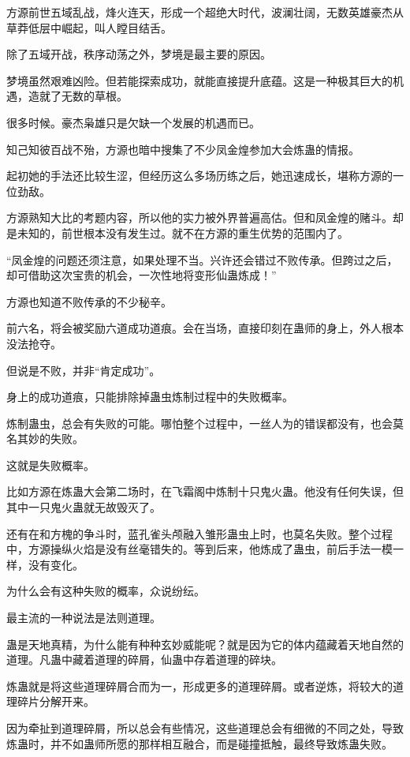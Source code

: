 \begin{this_body}
方源前世五域乱战，烽火连天，形成一个超绝大时代，波澜壮阔，无数英雄豪杰从草莽低层中崛起，叫人瞠目结舌。

除了五域开战，秩序动荡之外，梦境是最主要的原因。

梦境虽然艰难凶险。但若能探索成功，就能直接提升底蕴。这是一种极其巨大的机遇，造就了无数的草根。

很多时候。豪杰枭雄只是欠缺一个发展的机遇而已。

知己知彼百战不殆，方源也暗中搜集了不少凤金煌参加大会炼蛊的情报。

起初她的手法还比较生涩，但经历这么多场历练之后，她迅速成长，堪称方源的一位劲敌。

方源熟知大比的考题内容，所以他的实力被外界普遍高估。但和凤金煌的赌斗。却是未知的，前世根本没有发生过。就不在方源的重生优势的范围内了。

“凤金煌的问题还须注意，如果处理不当。兴许还会错过不败传承。但跨过之后，却可借助这次宝贵的机会，一次性地将变形仙蛊炼成！”

方源也知道不败传承的不少秘辛。

前六名，将会被奖励六道成功道痕。会在当场，直接印刻在蛊师的身上，外人根本没法抢夺。

但说是不败，并非“肯定成功”。

身上的成功道痕，只能排除掉蛊虫炼制过程中的失败概率。

炼制蛊虫，总会有失败的可能。哪怕整个过程中，一丝人为的错误都没有，也会莫名其妙的失败。

这就是失败概率。

比如方源在炼蛊大会第二场时，在飞霜阁中炼制十只鬼火蛊。他没有任何失误，但其中一只鬼火蛊就无故毁灭了。

还有在和方槐的争斗时，蓝孔雀头颅融入雏形蛊虫上时，也莫名失败。整个过程中，方源操纵火焰是没有丝毫错失的。等到后来，他炼成了蛊虫，前后手法一模一样，没有变化。

为什么会有这种失败的概率，众说纷纭。

最主流的一种说法是法则道理。

蛊是天地真精，为什么能有种种玄妙威能呢？就是因为它的体内蕴藏着天地自然的道理。凡蛊中藏着道理的碎屑，仙蛊中存着道理的碎块。

炼蛊就是将这些道理碎屑合而为一，形成更多的道理碎屑。或者逆炼，将较大的道理碎片分解开来。

因为牵扯到道理碎屑，所以总会有些情况，这些道理总会有细微的不同之处，导致炼蛊时，并不如蛊师所愿的那样相互融合，而是碰撞抵触，最终导致炼蛊失败。


\end{this_body}
